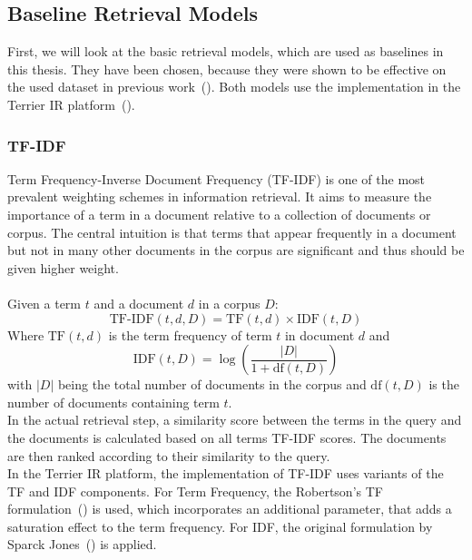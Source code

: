 \subsection{Baseline Retrieval Models}\label{sec:baseline-retrieval-models}
First, we will look at the basic retrieval models, which are used as baselines in this thesis.
They have been chosen, because they were shown to be effective on the used dataset in previous work~(\cite{goeuriot:2021}).
Both models use the implementation in the Terrier IR platform~(\cite{ounis:2005}).

\subsubsection{TF-IDF}\label{sec:tf-idf}
Term Frequency-Inverse Document Frequency (TF-IDF) is one of the most prevalent weighting schemes in information retrieval.
It aims to measure the importance of a term in a document relative to a collection of documents or corpus.
The central intuition is that terms that appear frequently in a document but not in many other documents in the corpus are significant and thus should be given higher weight.
\\\\
Given a term \( t \) and a document \( d \) in a corpus \( D \):
\[ \text{TF-IDF}(t, d, D) = \text{TF}(t, d) \times \text{IDF}(t, D) \]
Where \( \text{TF}(t, d) \) is the term frequency of term \( t \) in document \( d \) and 
\[ \text{IDF}(t, D) = \log \left( \frac{|D|}{1 + \text{df}(t, D)} \right) \]
with \( |D| \) being the total number of documents in the corpus and \( \text{df}(t, D) \) is the number of documents containing term \( t \).
\\
In the actual retrieval step, a similarity score between the terms in the query and the documents is calculated based on all terms TF-IDF scores.
The documents are then ranked according to their similarity to the query.
\\
In the Terrier IR platform, the implementation of TF-IDF uses variants of the TF and IDF components.
For Term Frequency, the Robertson's TF formulation~(\cite{robertson:2004}) is used, which incorporates an additional parameter, that adds a saturation effect to the term frequency.
For IDF, the original formulation by Sparck Jones~(\cite{sparck:1972}) is applied.

